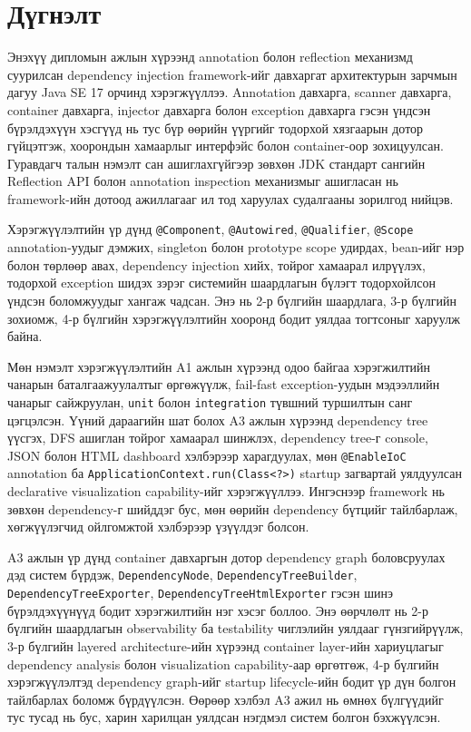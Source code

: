 \chapter{Дүгнэлт}

Энэхүү дипломын ажлын хүрээнд annotation болон reflection механизмд суурилсан dependency injection framework-ийг давхаргат архитектурын зарчмын дагуу Java SE 17 орчинд хэрэгжүүллээ. Annotation давхарга, scanner давхарга, container давхарга, injector давхарга болон exception давхарга гэсэн үндсэн бүрэлдэхүүн хэсгүүд нь тус бүр өөрийн үүргийг тодорхой хязгаарын дотор гүйцэтгэж, хоорондын хамаарлыг интерфэйс болон container-оор зохицуулсан. Гуравдагч талын нэмэлт сан ашиглахгүйгээр зөвхөн JDK стандарт сангийн Reflection API болон annotation inspection механизмыг ашигласан нь framework-ийн дотоод ажиллагааг ил тод харуулах судалгааны зорилгод нийцэв.

Хэрэгжүүлэлтийн үр дүнд \texttt{@Component}, \texttt{@Autowired}, \texttt{@Qualifier}, \texttt{@Scope} annotation-уудыг дэмжих, singleton болон prototype scope удирдах, bean-ийг нэр болон төрлөөр авах, dependency injection хийх, тойрог хамаарал илрүүлэх, тодорхой exception шидэх зэрэг системийн шаардлагын бүлэгт тодорхойлсон үндсэн боломжуудыг хангаж чадсан. Энэ нь 2-р бүлгийн шаардлага, 3-р бүлгийн зохиомж, 4-р бүлгийн хэрэгжүүлэлтийн хооронд бодит уялдаа тогтсоныг харуулж байна.

Мөн нэмэлт хэрэгжүүлэлтийн A1 ажлын хүрээнд одоо байгаа хэрэгжилтийн чанарын баталгаажуулалтыг өргөжүүлж, fail-fast exception-уудын мэдээллийн чанарыг сайжруулан, \texttt{unit} болон \texttt{integration} түвшний туршилтын санг цэгцэлсэн. Үүний дараагийн шат болох A3 ажлын хүрээнд dependency tree үүсгэх, DFS ашиглан тойрог хамаарал шинжлэх, dependency tree-г console, JSON болон HTML dashboard хэлбэрээр харагдуулах, мөн \texttt{@EnableIoC} annotation ба \texttt{ApplicationContext.run(Class<?>)} startup загвартай уялдуулсан declarative visualization capability-ийг хэрэгжүүллээ. Ингэснээр framework нь зөвхөн dependency-г шийддэг бус, мөн өөрийн dependency бүтцийг тайлбарлаж, хөгжүүлэгчид ойлгомжтой хэлбэрээр үзүүлдэг болсон.

A3 ажлын үр дүнд container давхаргын дотор dependency graph боловсруулах дэд систем бүрдэж, \texttt{DependencyNode}, \texttt{DependencyTreeBuilder}, \texttt{DependencyTreeExporter}, \texttt{DependencyTreeHtmlExporter} гэсэн шинэ бүрэлдэхүүнүүд бодит хэрэгжилтийн нэг хэсэг боллоо. Энэ өөрчлөлт нь 2-р бүлгийн шаардлагын observability ба testability чиглэлийн уялдааг гүнзгийрүүлж, 3-р бүлгийн layered architecture-ийн хүрээнд container layer-ийн хариуцлагыг dependency analysis болон visualization capability-аар өргөтгөж, 4-р бүлгийн хэрэгжүүлэлтэд dependency graph-ийг startup lifecycle-ийн бодит үр дүн болгон тайлбарлах боломж бүрдүүлсэн. Өөрөөр хэлбэл A3 ажил нь өмнөх бүлгүүдийг тус тусад нь бус, харин харилцан уялдсан нэгдмэл систем болгон бэхжүүлсэн.

